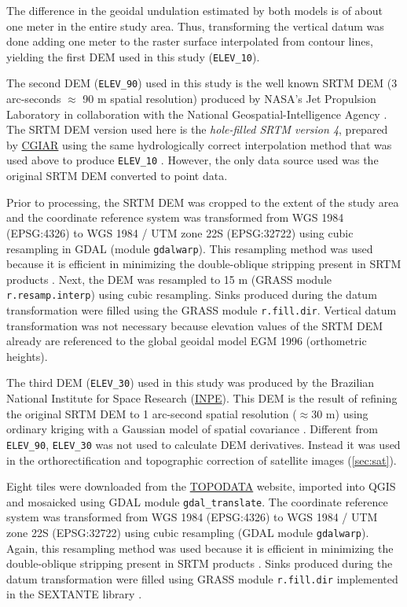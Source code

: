 The difference in the geoidal undulation estimated by both models is of about one meter in the entire study area. Thus, transforming the vertical datum was done adding one meter to the raster surface interpolated from contour lines, yielding the first DEM used in this study (\texttt{ELEV\_10}).

The second DEM (\texttt{ELEV\_90}) used in this study is the well known SRTM DEM (3 arc-seconds $\approx$ 90 m spatial resolution) produced by NASA’s Jet Propulsion Laboratory in collaboration with the National Geospatial-Intelligence Agency \cite{RodriguezEtAl2006}. The SRTM DEM version used here is the \textit{hole-filled SRTM version 4}, prepared by \href{http://www.cgiar.org/}{CGIAR} using the same hydrologically correct interpolation method that was used above to produce \texttt{ELEV\_10} \cite{ReuterEtAl2007, JarvisEtAl2008}. However, the only data source used was the original SRTM DEM converted to point data.

Prior to processing, the SRTM DEM was cropped to the extent of the study area and the coordinate reference system was transformed from WGS 1984 (EPSG:4326) to WGS 1984 / UTM zone 22S (EPSG:32722) using cubic resampling in GDAL (module \texttt{gdalwarp}). This resampling method was used because it is efficient in minimizing the double-oblique stripping present in SRTM products \cite{Samuel-RosaEtAl2013c}. Next, the DEM was resampled to 15 m (GRASS module \texttt{r.resamp.interp}) using cubic resampling. Sinks produced during the datum transformation were filled using the GRASS module \texttt{r.fill.dir}. Vertical datum transformation was not necessary because elevation values of the SRTM DEM already are referenced to the global geoidal model EGM 1996 (orthometric heights).

The third DEM (\texttt{ELEV\_30}) used in this study was produced by the Brazilian National Institute for Space Research (\href{http://www.inpe.br/}{INPE}). This DEM is the result of refining the original SRTM DEM to 1 arc-second spatial resolution ($\approx$30 m) using ordinary kriging with a Gaussian model of spatial covariance \cite{ValerianoEtAl2012}. Different from \texttt{ELEV\_90}, \texttt{ELEV\_30} was not used to calculate DEM derivatives. Instead it was used in the orthorectification and topographic correction of satellite images (\ref{sec:sat}).

Eight tiles were downloaded from the \href{http://www.dsr.inpe.br/topodata/}{TOPODATA} website, imported into QGIS and mosaicked using GDAL module \texttt{gdal\_translate}. The coordinate reference system was transformed from WGS 1984 (EPSG:4326) to WGS 1984 / UTM zone 22S (EPSG:32722) using cubic resampling (GDAL module \texttt{gdalwarp}). Again, this resampling method was used because it is efficient in minimizing the double-oblique stripping present in SRTM products \cite{Samuel-RosaEtAl2013c}. Sinks produced during the datum transformation were filled using GRASS module \texttt{r.fill.dir} implemented in the SEXTANTE library \cite{SEXTANTE2012}.

